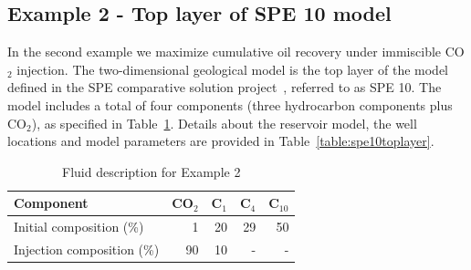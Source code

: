 \documentclass[twocolumn,numbook]{svjour3}          %
\begin{document}
\subsection{Example 2 - Top layer of SPE 10 model}
In the second example we maximize cumulative oil recovery under immiscible CO$_2$
injection. The two-dimensional geological model is the top layer of the model
defined in the SPE comparative solution project~\cite{Christie}, referred to as
SPE 10. The model includes a total of four components (three hydrocarbon
components plus CO$_2$), as specified in
Table~\ref{table:fluidForSPE10TopLayer}. Details about the
reservoir model, the well locations and model parameters are provided in
Table~\ref{table:spe10toplayer}.

%
\begin{table}
\centering
\caption{Fluid description for Example 2}
\begin{tabular}{|l|r|r|r|r|}
\hline
Component            & CO$_2$ & C$_1$ & C$_4$ & C$_{10}$    \\
\hline
Initial composition (\%)  & 1    & 20  & 29    & 50 \\
Injection composition (\%)& 90   & 10 & - & - \\
\hline
\end{tabular}
\label{table:fluidForSPE10TopLayer}
\end{table}
%
\end{document}
